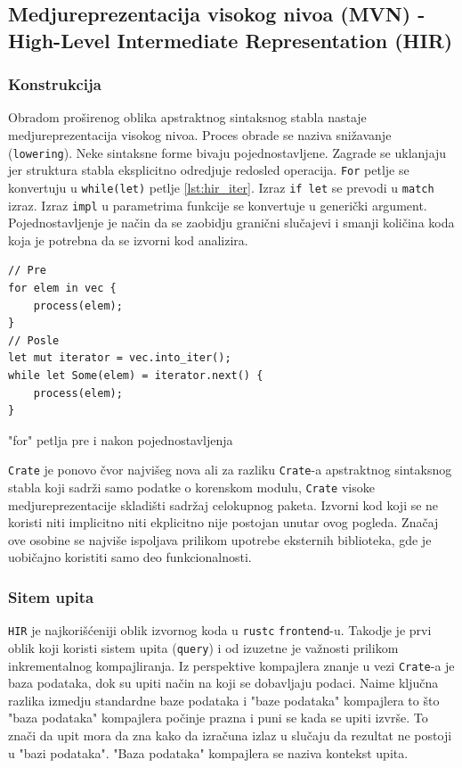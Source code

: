 \subsection{Medjureprezentacija visokog nivoa (MVN) - High-Level Intermediate Representation (HIR)}

\subsubsection{Konstrukcija}

Obradom proširenog oblika apstraktnog sintaksnog stabla nastaje medjureprezentacija visokog nivoa.
Proces obrade se naziva snižavanje (\verb|lowering|). Neke sintaksne forme bivaju pojednostavljene.
Zagrade se uklanjaju jer struktura stabla eksplicitno odredjuje redosled operacija. \verb|For| petlje 
se konvertuju u \verb|while(let)| petlje \ref{lst:hir_iter}. Izraz \verb|if let| se prevodi 
u \verb|match| izraz. Izraz \verb|impl| u parametrima funkcije se konvertuje u generički argument.
Pojednostavljenje je način da se zaobidju granični slučajevi i smanji količina koda koja je potrebna 
da se izvorni kod analizira.

\begin{listing}[H]
\begin{verbatim}
// Pre
for elem in vec {
    process(elem);
}
// Posle
let mut iterator = vec.into_iter();
while let Some(elem) = iterator.next() {
    process(elem);
}
\end{verbatim}
\caption{"for" petlja pre i nakon pojednostavljenja}
\label{lst:hir_iter}
\end{listing}

\verb|Crate| je ponovo čvor najvišeg nova ali za razliku \verb|Crate|-a apstraktnog sintaksnog stabla koji sadrži
samo podatke o korenskom modulu, \verb|Crate| visoke medjureprezentacije skladišti sadržaj celokupnog paketa.
Izvorni kod koji se ne koristi niti implicitno niti ekplicitno nije postojan unutar ovog pogleda. Značaj 
ove osobine se najviše ispoljava prilikom upotrebe eksternih biblioteka, gde je uobičajno koristiti samo 
deo funkcionalnosti.

\subsubsection{Sitem upita}

\verb|HIR| je najkorišćeniji oblik izvornog koda u \verb|rustc| \verb|frontend|-u. Takodje je prvi oblik koji 
koristi sistem upita (\verb|query|) i od izuzetne je važnosti prilikom inkrementalnog kompajliranja.
Iz perspektive kompajlera znanje u vezi \verb|Crate|-a je baza podataka, dok su upiti način na koji 
se dobavljaju podaci. Naime ključna razlika izmedju standardne baze podataka i "baze podataka" kompajlera
to što "baza podataka" kompajlera počinje prazna i puni se kada se upiti izvrše. To znači da upit mora 
da zna kako da izračuna izlaz u slučaju da rezultat ne postoji u "bazi podataka". "Baza podataka" kompajlera 
se naziva kontekst upita.

